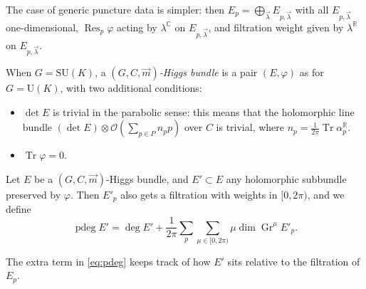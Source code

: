 \documentclass[12pt,letterpaper,reqno]{article}
\numberwithin{equation}{section}
\newcommand{\cO}{\ensuremath{\mathcal O}}
\newcommand{\R}{\ensuremath{\mathbb R}}
\newcommand{\C}{\ensuremath{\mathbb C}}
\newcommand{\ti}[1]{\textit{#1}}
\DeclareMathOperator{\Tr}{Tr}
\DeclareMathOperator{\Res}{Res}
\DeclareMathOperator{\pdeg}{pdeg}
\DeclareMathOperator{\Gr}{Gr}
\newcommand{\SU}{\mathrm{SU}}
\newcommand{\U}{\mathrm{U}}
\begin{document}
\begin{remark}
The case of generic puncture data is simpler:
then $E_p = \bigoplus_{\vec\lambda} E_{p,\vec\lambda}$
with all $E_{p,\vec\lambda}$ one-dimensional, $\Res_p \varphi$ 
acting by $\lambda^\C$ on $E_{p,\vec\lambda}$, and filtration weight given by $\lambda^\R$ on $E_{p,\vec\lambda}$.
\end{remark}


\begin{defn}[Parabolic Higgs bundles for $G = \SU(K)$]
When $G = \SU(K)$, a \ti{$(G,C,\vec m)$-Higgs bundle} 
is a pair $(E, \varphi)$ as for $G = \U(K)$, with two additional conditions:
\begin{itemize} 
\item $\det E$ is trivial in the parabolic sense: this means
that the holomorphic line bundle $(\det E) \otimes \cO\left(\sum_{p \in P} n_p p\right)$ over $C$ is trivial, where $n_p = \frac{1}{2\pi}\Tr \alpha_p^\R$.
\item $\Tr \varphi = 0$.
\end{itemize}
\end{defn}

\begin{defn}
Let $E$ be a $(G, C, \vec m)$-Higgs bundle,
and $E' \subset E$ any holomorphic subbundle preserved by
$\varphi$. Then $E'_p$ also gets a filtration with
weights in $[0,2\pi)$, and we define
\begin{equation} \label{eq:pdeg}
  \pdeg E' = \deg E' + \frac{1}{2\pi} \sum_p \sum_{\mu \in [0,2\pi)} \mu \dim \Gr^\mu E'_p.
\end{equation}
\end{defn}

The extra term in \eqref{eq:pdeg} keeps track of how $E'$
sits relative to the filtration of $E_p$.
\end{document}
